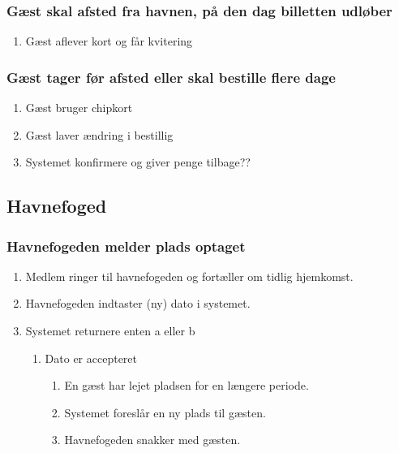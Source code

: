\subsubsection{Gæst skal afsted fra havnen, på den dag billetten udløber}
  \begin{enumerate}
    \item Gæst aflever kort og får kvitering
  \end{enumerate}

\subsubsection{Gæst tager før afsted eller skal bestille flere dage}
  \begin{enumerate}
    \item Gæst bruger chipkort
    \item Gæst laver ændring i bestillig
    \item Systemet konfirmere og giver penge tilbage??
  \end{enumerate}

\subsection{Havnefoged}

    \subsubsection{Havnefogeden melder plads optaget}

    \begin{enumerate}
      \item Medlem ringer til havnefogeden og fortæller om tidlig hjemkomst.
      \item Havnefogeden indtaster (ny) dato i systemet.
      \item Systemet returnere enten a eller b
      \begin{enumerate}
        \item Dato er accepteret
        \begin{enumerate}
          \item En gæst har lejet pladsen for en længere periode.
          \item Systemet foreslår en ny plads til gæsten.
          \item Havnefogeden snakker med gæsten.
        \end{enumerate}
      \end{enumerate}  
    \end{enumerate}



